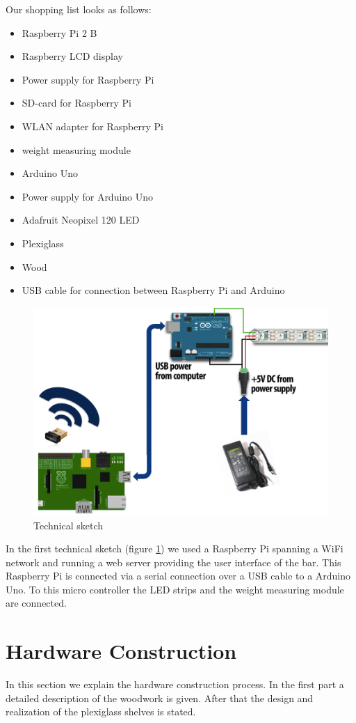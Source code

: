 \documentclass{acm_proc_article-sp}
\begin{document}
Our shopping list looks as follows:
\begin{itemize}
\item Raspberry Pi 2 B
\item Raspberry LCD display
\item Power supply for Raspberry Pi
\item SD-card for Raspberry Pi
\item WLAN adapter for Raspberry Pi
\item weight measuring module
\item Arduino Uno
\item Power supply for Arduino Uno
\item Adafruit Neopixel 120 LED
\item Plexiglass
\item Wood
\item USB cable for connection between Raspberry Pi and Arduino
\end{itemize}
\begin{figure}[htbp] 
  \centering
     \includegraphics[width=0.7\linewidth]{pictures/technical.png}
  \caption{Technical sketch}
  \label{fig:technical}
\end{figure}

In the first technical sketch (figure \ref{fig:technical}) we used a Raspberry Pi spanning a WiFi network and running a web server providing the user interface of the bar. This Raspberry Pi is connected via a serial connection over a USB cable to a Arduino Uno. To this micro controller the LED strips and the weight measuring module are connected.

\section{Hardware Construction}
In this section we explain the hardware construction process. In the first part a detailed description of the woodwork is given. After that the design and realization of the plexiglass shelves is stated.
\end{document}

